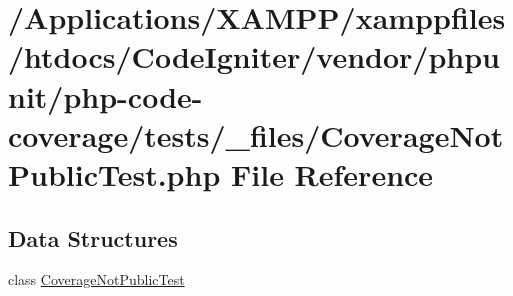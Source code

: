 \hypertarget{php-code-coverage_2tests_2__files_2_coverage_not_public_test_8php}{}\section{/\+Applications/\+X\+A\+M\+P\+P/xamppfiles/htdocs/\+Code\+Igniter/vendor/phpunit/php-\/code-\/coverage/tests/\+\_\+files/\+Coverage\+Not\+Public\+Test.php File Reference}
\label{php-code-coverage_2tests_2__files_2_coverage_not_public_test_8php}
\subsection*{Data Structures}
\begin{DoxyCompactItemize}
\item 
class \mbox{\hyperlink{class_coverage_not_public_test}{Coverage\+Not\+Public\+Test}}
\end{DoxyCompactItemize}

